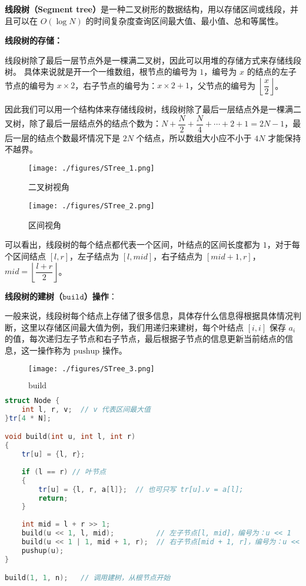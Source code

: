
\textbf{线段树（Segment tree）}是一种二叉树形的数据结构，用以存储区间或线段，并且可以在 $O(\log N)$ 的时间复杂度查询区间最大值、最小值、总和等属性。

\textbf{线段树的存储：}

线段树除了最后一层节点外是一棵满二叉树，因此可以用堆的存储方式来存储线段树。
具体来说就是开一个一维数组，根节点的编号为 $1$，编号为 $x$ 的结点的左子节点的编号为 $x \times 2$，右子节点的编号为：$x \times 2 + 1$，父节点的编号为 $\left\lfloor\dfrac{x}{2}\right\rfloor$。

因此我们可以用一个结构体来存储线段树，线段树除了最后一层结点外是一棵满二叉树，除了最后一层结点外的结点个数为：$N + \dfrac{N}{2} + \dfrac{N}{4} + \cdots + 2 + 1 = 2N - 1$，最后一层的结点个数最坏情况下是 $2N$ 个结点，所以数组大小应不小于 $4N$ 才能保持不越界。

\begin{figure}[ht]
\centering
\texttt{[image: ./figures/STree\_1.png]}
\caption{二叉树视角} \label{STree_fig1}
\end{figure}

\begin{figure}[ht]
\centering
\texttt{[image: ./figures/STree\_2.png]}
\caption{区间视角} \label{STree_fig2}
\end{figure}


可以看出，线段树的每个结点都代表一个区间，叶结点的区间长度都为 $1$，对于每个区间结点 $[l, r]$，左子结点为 $[l, mid]$，右子结点为 $[mid + 1, r]$，$mid = \left\lfloor\dfrac{l+r}{2}\right\rfloor$。

\textbf{线段树的建树（$\texttt{build}$）操作}：

一般来说，线段树每个结点上存储了很多信息，具体存什么信息得根据具体情况判断，这里以存储区间最大值为例，我们用递归来建树，每个叶结点 $[i, i]$ 保存 $a_i$ 的值，每次递归左子节点和右子节点，最后根据子节点的信息更新当前结点的信息，这一操作称为 $\text{pushup}$ 操作。

\begin{figure}[ht]
\centering
\texttt{[image: ./figures/STree\_3.png]}
\caption{$\text{build}$} \label{STree_fig3}
\end{figure}


\begin{lstlisting}[language=cpp]
struct Node {
    int l, r, v;  // v 代表区间最大值
}tr[4 * N];

void build(int u, int l, int r) 
{
    tr[u] = {l, r};
    
    if (l == r) // 叶节点
    {
        tr[u] = {l, r, a[l]};  // 也可只写 tr[u].v = a[l];
        return;
    }
    
    int mid = l + r >> 1;
    build(u << 1, l, mid);          // 左子节点[l, mid]，编号为：u << 1
    build(u << 1 | 1, mid + 1, r);  // 右子节点[mid + 1, r]，编号为：u << 1 | 1
    pushup(u);
}

build(1, 1, n);   // 调用建树，从根节点开始
\end{lstlisting}


